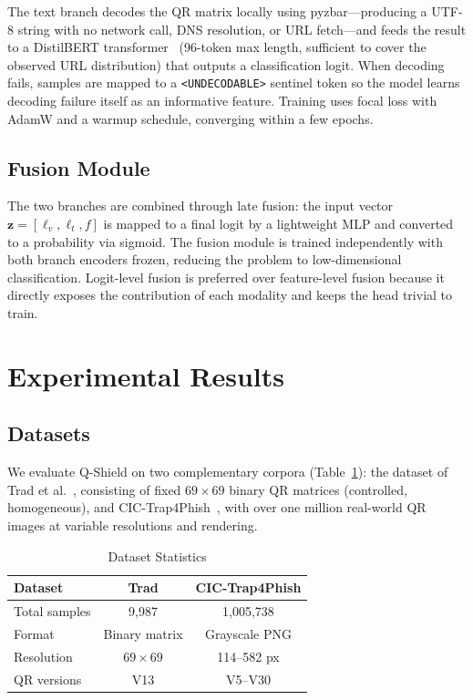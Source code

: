 \documentclass[conference]{IEEEtran}
\begin{document}
The text branch decodes the QR matrix locally using pyzbar---producing a UTF-8 string with no network call, DNS resolution, or URL fetch---and feeds the result to a DistilBERT transformer~\cite{sanh2019distilbert} (96-token max length, sufficient to cover the observed URL distribution) that outputs a classification logit. When decoding fails, samples are mapped to a \texttt{<UNDECODABLE>} sentinel token so the model learns decoding failure itself as an informative feature. Training uses focal loss with AdamW and a warmup schedule, converging within a few epochs.

\subsection{Fusion Module}
\label{sec:fusion}

The two branches are combined through late fusion: the input vector $\mathbf{z} = [\ell_v, \ell_t, f]$ is mapped to a final logit by a lightweight MLP and converted to a probability via sigmoid. The fusion module is trained independently with both branch encoders frozen, reducing the problem to low-dimensional classification. Logit-level fusion is preferred over feature-level fusion because it directly exposes the contribution of each modality and keeps the head trivial to train.

\section{Experimental Results}
\label{sec:results}

\subsection{Datasets}

We evaluate Q-Shield on two complementary corpora (Table~\ref{tab:datasets}): the dataset of Trad et al.~\cite{trad2025detecting}, consisting of fixed $69\times69$ binary QR matrices (controlled, homogeneous), and CIC-Trap4Phish~\cite{nejati2026cic}, with over one million real-world QR images at variable resolutions and rendering.


\begin{table}[htp]
\caption{Dataset Statistics}
\label{tab:datasets}
\centering
\small
\begin{tabular}{lcc}
\toprule
\textbf{Dataset} & \textbf{Trad} & \textbf{CIC-Trap4Phish} \\
\midrule
Total samples & 9,987 & 1,005,738 \\
Format & Binary matrix & Grayscale PNG \\
Resolution & $69\times69$ & 114--582 px \\
QR versions & V13 & V5--V30 \\
\bottomrule
\end{tabular}
\end{table}
\end{document}

